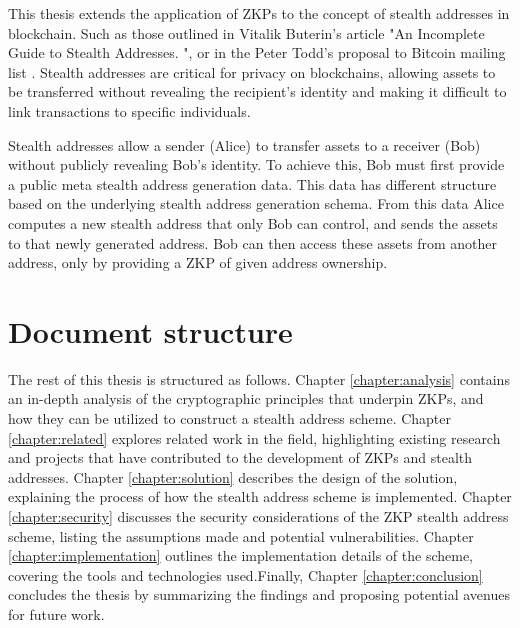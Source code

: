 This thesis extends the application of ZKPs to the concept of stealth
addresses in blockchain. Such as those outlined in Vitalik Buterin's article "An
Incomplete Guide to Stealth Addresses. "\cite{ButerinIncompleteGuide}, or
in the Peter Todd's proposal to Bitcoin mailing list \cite{ToddStealthAddresses}.
Stealth addresses are critical for privacy on blockchains, allowing assets to
be transferred without revealing the recipient's identity and making
it difficult to link transactions to specific individuals.

Stealth addresses allow a sender (Alice) to transfer assets to a receiver (Bob) without
publicly revealing Bob's identity. To achieve this, Bob
must first provide a public meta stealth address generation data. This data
has different structure based on the underlying stealth address generation
schema. From this data Alice computes a new stealth address that only Bob can
control, and sends the assets to that newly generated address. Bob can then
access these assets from another address, only by providing a ZKP of given
address ownership.

\section{Document structure}

The rest of this thesis is structured as follows. Chapter \ref{chapter:analysis}
contains an in-depth analysis of the cryptographic principles that underpin ZKPs,
and how they can be utilized to construct a stealth address scheme.
 Chapter \ref{chapter:related} explores related work in the field, highlighting
existing research and projects that have contributed to the development of ZKPs and
stealth addresses. Chapter
\ref{chapter:solution} describes the design of the solution, explaining the process
of how the stealth address scheme is implemented. Chapter \ref{chapter:security}
discusses the security considerations of the ZKP stealth address scheme, listing
the assumptions made and potential vulnerabilities. Chapter \ref{chapter:implementation}
outlines the implementation details of the scheme, covering the tools and technologies
used.Finally, Chapter \ref{chapter:conclusion} concludes the thesis by
summarizing the findings and proposing potential avenues for future work.

